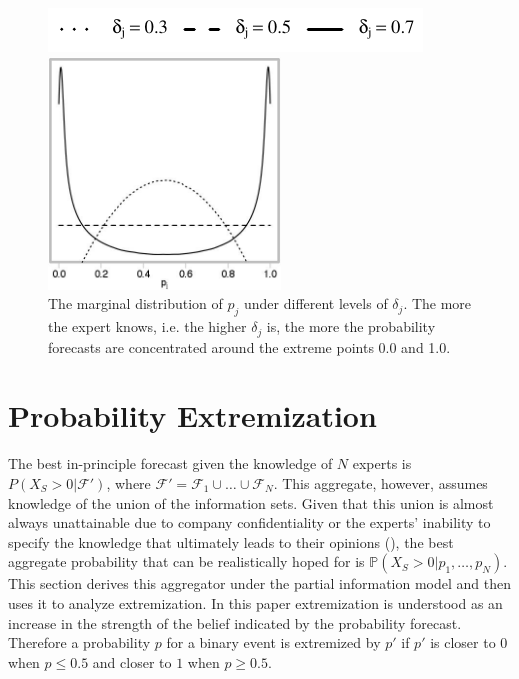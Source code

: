 \documentclass[11pt,twoside]{article}
\renewcommand{\P}{\mathbb{P}}
\theoremstyle{definition}
\theoremstyle{definition}
\begin{document}
\begin{figure}[t]
\centering
	\hspace{0em}\includegraphics{LegendMarginal}

 \includegraphics[width= 0.55\textwidth]{Marginals}
   \caption{The marginal distribution of $p_j$ under different levels of $\delta_j$. The more the expert knows, i.e. the higher $\delta_j$ is, the more the probability forecasts are concentrated around the extreme points 0.0 and 1.0.}
\label{marginals}
\end{figure}


\section{Probability Extremization}
\label{extremization}
The best in-principle forecast given the knowledge of $N$ experts is $P(X_{S} > 0 |  \mathcal{F}')$, where $\mathcal{F}' = \mathcal{F}_1 \cup \dots \cup \mathcal{F}_N$. This aggregate, however, assumes knowledge of the union of the information sets. Given that this union is almost always unattainable due to company confidentiality or the experts' inability to specify the knowledge that ultimately leads to their opinions (\cite{dawid1995coherent}), the best aggregate probability that can be realistically hoped for is  $\P(X_{S} > 0 | p_1, \dots, p_N)$. This section derives this aggregator under the partial information model and then uses it to analyze extremization.  In this paper extremization is understood as an increase in the strength of the belief indicated by the probability forecast. Therefore a probability $p$ for a binary event is extremized by $p'$ if $p'$ is closer to $0$ when $p \leq 0.5$ and closer to $1$ when $p \geq 0.5$.  
\end{document}
